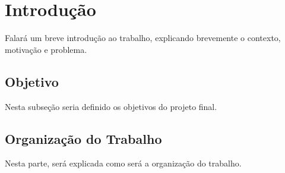 \chapter{Introdução}\label{chp:INTRODUCAO}

Falará um breve introdução ao trabalho, explicando brevemente o contexto, motivação e problema.

\section{Objetivo}

Nesta subseção seria definido os objetivos do projeto final.

\section{Organização do Trabalho}

Nesta parte, será explicada como será a organização do trabalho.